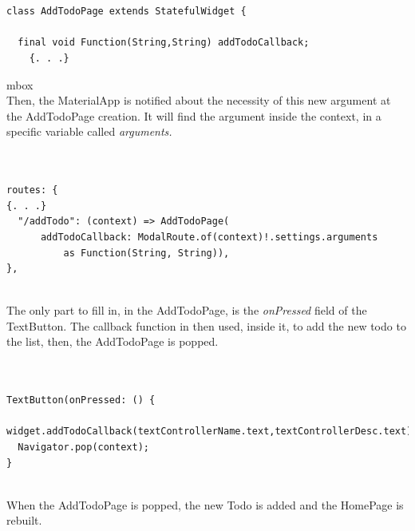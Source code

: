 \mbox{}\\
\begin{code}
\begin{verbatim}

class AddTodoPage extends StatefulWidget {

  final void Function(String,String) addTodoCallback;
    {. . .}
\end{verbatim}
\end{code}
mbox{}\\
Then, the MaterialApp is notified about the necessity of this new argument at the AddTodoPage creation. It will find the argument inside the context, in a specific variable called \textit{arguments.}
\mbox{}\\


\mbox{}\\
\begin{code}
\begin{verbatim}

routes: {
{. . .}
  "/addTodo": (context) => AddTodoPage(
      addTodoCallback: ModalRoute.of(context)!.settings.arguments
          as Function(String, String)),
},

\end{verbatim}
\end{code}
\mbox{}\\

The only part to fill in, in the AddTodoPage, is the \textit{onPressed} field of the TextButton. The callback function in then used, inside it, to add the new todo to the list, then, the AddTodoPage is popped.
\mbox{}\\


\mbox{}\\ 

\begin{code}
\begin{verbatim}

TextButton(onPressed: () {
  widget.addTodoCallback(textControllerName.text,textControllerDesc.text);
  Navigator.pop(context);
}
\end{verbatim}
\end{code}
\mbox{}\\

When the AddTodoPage is popped, the new Todo is added and the HomePage is rebuilt.\\
\\

